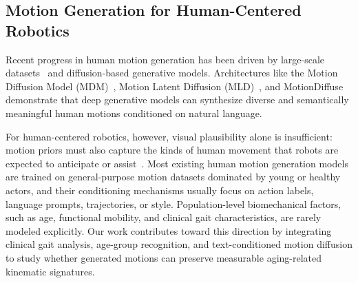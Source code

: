 \subsection{Motion Generation for Human-Centered Robotics}

Recent progress in human motion generation has been driven by large-scale datasets~\cite{mahmood2019amass, guo2022generating} and diffusion-based generative models.
Architectures like the Motion Diffusion Model (MDM)~\cite{tevet2023human}, Motion Latent Diffusion (MLD)~\cite{chen2023executing}, and MotionDiffuse~\cite{zhang2024motiondiffuse} demonstrate that deep generative models can synthesize diverse and semantically meaningful human motions conditioned on natural language.

For human-centered robotics, however, visual plausibility alone is insufficient: motion priors must also capture the kinds of human movement that robots are expected to anticipate or assist~\cite{sisbot2007human}.
Most existing human motion generation models are trained on general-purpose motion datasets dominated by young or healthy actors, and their conditioning mechanisms usually focus on action labels, language prompts, trajectories, or style.
Population-level biomechanical factors, such as age, functional mobility, and clinical gait characteristics, are rarely modeled explicitly.
Our work contributes toward this direction by integrating clinical gait analysis, age-group recognition, and text-conditioned motion diffusion to study whether generated motions can preserve measurable aging-related kinematic signatures.
